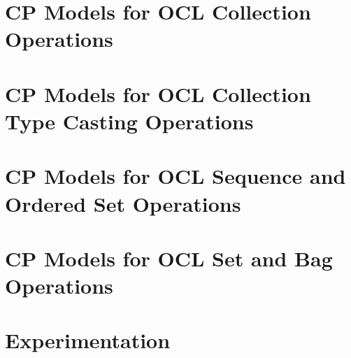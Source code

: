 \section{CP Models for OCL Collection Operations}


\newpage
\section{CP Models for OCL Collection Type Casting Operations}


\newpage
\section{CP Models for OCL Sequence and Ordered Set Operations}


\newpage
\section{CP Models for OCL Set and Bag Operations}


\newpage
% 

\newpage
\section{Experimentation}


% 

% 